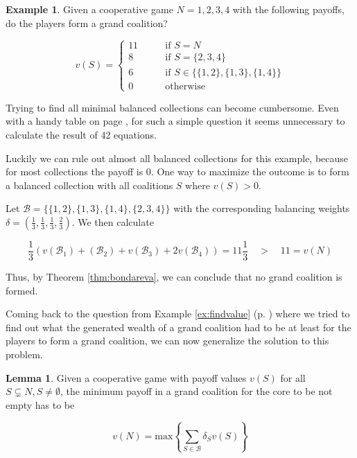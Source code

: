 \documentclass[10pt,a4paper,titlepage]{article}
\theoremstyle{plain}
\theoremstyle{definition}
\newtheorem{example}[thm]{Example} %
\newtheorem{lemma}[thm]{Lemma}
\begin{document}
\begin{example}
    Given a cooperative game $N = {1, 2, 3, 4}$ with the following payoffs, do the players form a grand coalition? 
    
    \begin{equation*}
        v(S) = \begin{cases}
            11 &\qquad \text{if } S = N\\
            8 &\qquad \text{if } S = \{2, 3, 4\}\\
            6 &\qquad \text{if } S \in \{\{1, 2\}, \{1, 3\}, \{1, 4\}\}\\
            0 &\qquad \text{otherwise}
        \end{cases}
    \end{equation*}
    
    Trying to find all minimal balanced collections can become cumbersome. Even with a handy table on page \pageref{bonus}, for such a simple question it seems unnecessary to calculate the result of 42 equations.

    Luckily we can rule out almost all balanced collections for this example, because for most collections the payoff is $0$. One way to maximize the outcome is to form a balanced collection with all coalitions $S$ where $v(S) > 0$.

    Let $\mathcal{B} = \{\{1, 2\}, \{1, 3\}, \{1, 4\}, \{2, 3, 4\}\}$ with the corresponding balancing weights $\delta = \left(\frac{1}{3}, \frac{1}{3}, \frac{1}{3}, \frac{2}{3}\right)$. We then calculate

    \begin{equation*}
        \frac{1}{3}\left(v(\mathcal{B}_1) + (\mathcal{B}_2) + v(\mathcal{B}_3) + 2v(\mathcal{B}_4)\right) = 11\frac{1}{3}\quad >\quad 11 = v(N)
    \end{equation*}

    Thus, by Theorem \ref{thm:bondareva}, we can conclude that no grand coalition is formed.
\end{example}

Coming back to the question from Example \ref{ex:findvalue} (p. \pageref{ex:findvalue}) where we tried to find out what the generated wealth of a grand coalition had to be at least for the players to form a grand coalition, we can now generalize the solution to this problem.

\begin{lemma}
    Given a cooperative game with payoff values $v(S)$ for all $S \subsetneq N, S \neq \emptyset$, the minimum payoff in a grand coalition for the core to be not empty has to be

    \begin{equation}
        v(N) = \text{max} \left\{\sum_{S \in \mathcal{B}} \delta_S v(S)\right\}
    \end{equation}
\end{lemma}
\end{document}
